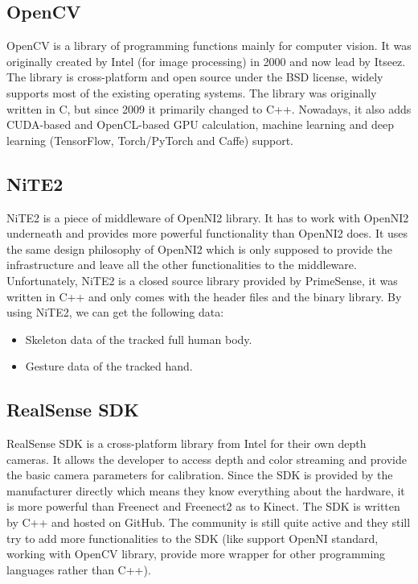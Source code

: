 \subsection{OpenCV}

OpenCV is a library of programming functions mainly for computer vision. It
was originally created by Intel (for image processing) in 2000 and now lead by
Itseez. The library is cross-platform and open source under the BSD license,
widely supports most of the existing operating systems. The library was 
originally written in C, but since 2009 it primarily changed to C++. Nowadays, 
it also adds CUDA-based and OpenCL-based GPU calculation, machine learning and
deep learning (TensorFlow, Torch/PyTorch and Caffe) support.

\subsection{NiTE2}
\label{sec:related_work_openiss_nite2}

NiTE2 is a piece of middleware of OpenNI2 library. It has to work with OpenNI2
underneath and provides more powerful functionality than OpenNI2 does. It uses 
the same design philosophy of OpenNI2 which is only supposed to provide the
infrastructure and leave all the other functionalities to the middleware.
Unfortunately, NiTE2 is a closed source library provided by PrimeSense, it was
written in C++ and only comes with the header files and the binary library. By
using NiTE2, we can get the following data:

\begin{itemize}
    \item Skeleton data of the tracked full human body.
    \item Gesture data of the tracked hand.
\end{itemize}

\subsection{RealSense SDK}

RealSense SDK is a cross-platform library from Intel for their own depth
cameras. It allows the developer to access depth and color streaming and
provide the basic camera parameters for calibration. Since the SDK is provided
by the manufacturer directly which means they know everything about the
hardware, it is more powerful than Freenect and Freenect2 as to Kinect. The SDK
is written by C++ and hosted on GitHub. The
community is still quite active and they still try to add more functionalities
to the SDK (like support OpenNI standard, working with OpenCV library, provide
more wrapper for other programming languages rather than C++).

